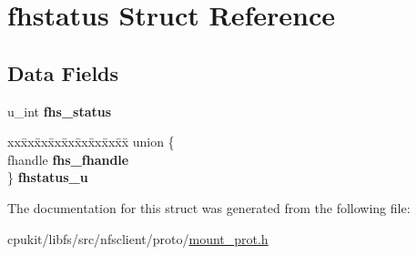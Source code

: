 \hypertarget{structfhstatus}{}\section{fhstatus Struct Reference}
\label{structfhstatus}
\subsection*{Data Fields}
\begin{DoxyCompactItemize}
\item 
\mbox{\label{structfhstatus_af214a535941faa59b46eda8bfd55b944}} 
u\+\_\+int {\bfseries fhs\+\_\+status}
\item 
\mbox{\label{structfhstatus_a947fb0788e4292f7433034d9bb484389}} 
\begin{tabbing}
xx\=xx\=xx\=xx\=xx\=xx\=xx\=xx\=xx\=\kill
union \{\\
\>fhandle {\bfseries fhs\_fhandle}\\
\} {\bfseries fhstatus\_u}\\

\end{tabbing}\end{DoxyCompactItemize}


The documentation for this struct was generated from the following file\+:\begin{DoxyCompactItemize}
\item 
cpukit/libfs/src/nfsclient/proto/\mbox{\hyperlink{mount__prot_8h}{mount\+\_\+prot.\+h}}\end{DoxyCompactItemize}
